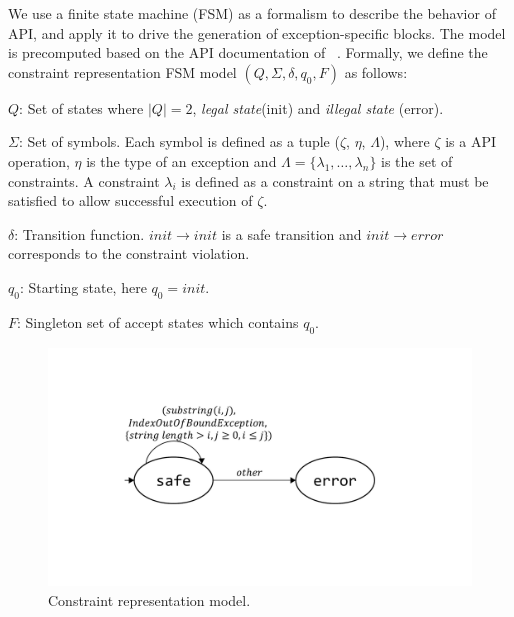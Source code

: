 
  We use a finite state machine
(FSM) as a formalism to describe the behavior of \java\  API, and 
apply it to drive the generation of exception-specific  blocks. The
model is precomputed based on the API documentation of \java\ .
Formally, we define the constraint representation FSM model $(Q, \Sigma, \delta,
q_0, F)$ as follows:
\begin{mybullet}
 \item $Q$: Set of states where $|Q| = 2$, \emph{legal state}(init) and
\emph{illegal state} (error).

 \item $\Sigma$: Set of symbols. Each symbol is defined as a tuple ($\zeta$,
$\eta$, $\Lambda$), where $\zeta$ is a  API operation, $\eta$ is
the type of an exception and $\Lambda = \{\lambda_1, \ldots, \lambda_n\}$  is
the set of constraints. A constraint $\lambda_i$ is defined as a constraint on
a string that must be satisfied to allow successful execution of $\zeta$.

 \item $\delta$: Transition function. $init \rightarrow init$ is a safe
transition and $init \rightarrow error$ corresponds to the constraint violation.

 \item $q_0$: Starting state, here $q_0 = init$.

 \item $F$: Singleton set of accept states which contains $q_0$.
\end{mybullet}

\begin{figure}[t]
\centering
\includegraphics[scale=.25]{images/automataString.pdf}
\caption{Constraint representation model.}
\label{fig:constraintautomata}
\end{figure}

